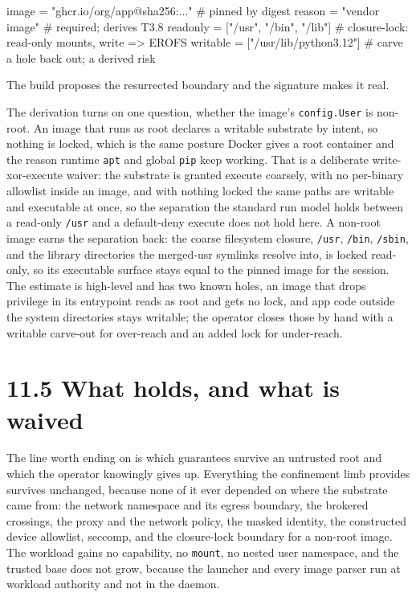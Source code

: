 \begin{kennelcode}
[rootfs]
image    = "ghcr.io/org/app@sha256:..."   # pinned by digest
reason   = "vendor image"                  # required; derives T3.8
readonly = ["/usr", "/bin", "/lib"]        # closure-lock: read-only mounts, write => EROFS
writable = ["/usr/lib/python3.12"]         # carve a hole back out; a derived risk
\end{kennelcode}

The build proposes the resurrected boundary and the signature makes it
real.

The derivation turns on one question, whether the image's
\texttt{config.User} is non-root. An image that runs as root declares a
writable substrate by intent, so nothing is locked, which is the same
posture Docker gives a root container and the reason runtime
\texttt{apt} and global \texttt{pip} keep working. That is a deliberate
write-xor-execute waiver: the substrate is granted execute coarsely,
with no per-binary allowlist inside an image, and with nothing locked
the same paths are writable and executable at once, so the separation
the standard run model holds between a read-only \texttt{/usr} and a
default-deny execute does not hold here. A non-root image earns the
separation back: the coarse filesystem closure, \texttt{/usr},
\texttt{/bin}, \texttt{/sbin}, and the library directories the
merged-usr symlinks resolve into, is locked read-only, so its executable
surface stays equal to the pinned image for the session. The estimate is
high-level and has two known holes, an image that drops privilege in its
entrypoint reads as root and gets no lock, and app code outside the
system directories stays writable; the operator closes those by hand
with a writable carve-out for over-reach and an added lock for
under-reach.

\hypertarget{what-holds-and-what-is-waived}{%
\section{11.5 What holds, and what is
waived}\label{what-holds-and-what-is-waived}}

The line worth ending on is which guarantees survive an untrusted root
and which the operator knowingly gives up. Everything the confinement
limb provides survives unchanged, because none of it ever depended on
where the substrate came from: the network namespace and its egress
boundary, the brokered crossings, the proxy and the network policy, the
masked identity, the constructed device allowlist, seccomp, and the
closure-lock boundary for a non-root image. The workload gains no
capability, no \texttt{mount}, no nested user namespace, and the trusted
base does not grow, because the launcher and every image parser run at
workload authority and not in the daemon.

